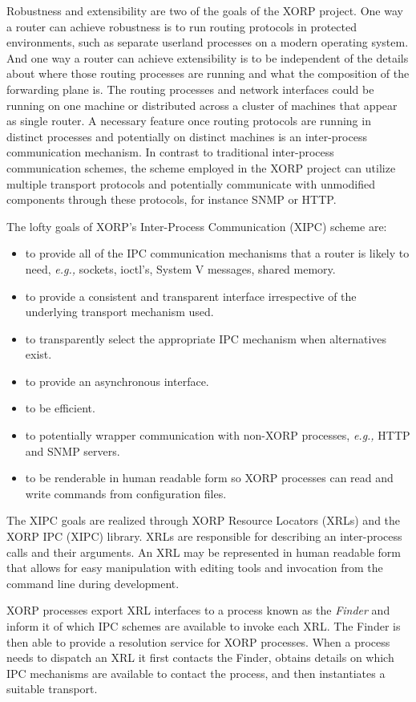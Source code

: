 \documentclass[11pt]{article}
\newcommand{\eg}{\emph{e.g.,}\xspace}
\begin{document}
Robustness and extensibility are two of the goals of the XORP project.
One way a router can achieve robustness is to run routing protocols in
protected environments, such as separate userland processes on a
modern operating system.  And one way a router can achieve
extensibility is to be independent of the details about where those
routing processes are running and what the composition of the
forwarding plane is.  The routing processes and network interfaces
could be running on one machine or distributed across a cluster of
machines that appear as single router.  A necessary feature once
routing protocols are running in distinct processes and potentially on
distinct machines is an inter-process communication mechanism.  In
contrast to traditional inter-process communication schemes, the
scheme employed in the XORP project can utilize multiple transport
protocols and potentially communicate with unmodified components
through these protocols, for instance SNMP or HTTP.

The lofty goals of XORP's Inter-Process Communication (XIPC) scheme are:

\begin{itemize}
  \item to provide all of the IPC communication mechanisms that a router is
	likely to need, \eg sockets, ioctl's, System V messages, shared memory.
  \item to provide a consistent and transparent interface irrespective
	of the underlying transport mechanism used.
  \item to transparently select the appropriate IPC mechanism when
	alternatives exist.
  \item to provide an asynchronous interface.
  \item to be efficient.
  \item to potentially wrapper communication with non-XORP processes,
	\eg HTTP and SNMP servers.
  \item to be renderable in human readable form so XORP processes can
	read and write commands from configuration files.
\end{itemize}

The XIPC goals are realized through XORP Resource Locators (XRLs) and
the XORP IPC (XIPC) library.  XRLs are responsible for describing an
inter-process calls and their arguments.  An XRL may be represented in
human readable form that allows for easy manipulation with editing
tools and invocation from the command line during development.

XORP processes export XRL interfaces to a process known as the {\em
Finder} and inform it of which IPC schemes are available to invoke
each XRL.  The Finder is then able to provide a resolution service for
XORP processes.  When a process needs to dispatch an XRL it first
contacts the Finder, obtains details on which IPC mechanisms are
available to contact the process, and then instantiates
a suitable transport.
\end{document}

